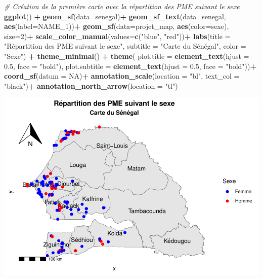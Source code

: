 \documentclass[
]{article}
\newenvironment{Shaded}{\begin{snugshade}}{\end{snugshade}}
\newcommand{\AttributeTok}[1]{\textcolor[rgb]{0.13,0.29,0.53}{#1}}
\newcommand{\CommentTok}[1]{\textcolor[rgb]{0.56,0.35,0.01}{\textit{#1}}}
\newcommand{\ConstantTok}[1]{\textcolor[rgb]{0.56,0.35,0.01}{#1}}
\newcommand{\DecValTok}[1]{\textcolor[rgb]{0.00,0.00,0.81}{#1}}
\newcommand{\FloatTok}[1]{\textcolor[rgb]{0.00,0.00,0.81}{#1}}
\newcommand{\FunctionTok}[1]{\textcolor[rgb]{0.13,0.29,0.53}{\textbf{#1}}}
\newcommand{\NormalTok}[1]{#1}
\newcommand{\SpecialCharTok}[1]{\textcolor[rgb]{0.81,0.36,0.00}{\textbf{#1}}}
\newcommand{\StringTok}[1]{\textcolor[rgb]{0.31,0.60,0.02}{#1}}
\begin{document}
\begin{Shaded}
\begin{Highlighting}[]
\CommentTok{\# Création de la première carte avec la répartition des PME suivant le sexe}
\FunctionTok{ggplot}\NormalTok{() }\SpecialCharTok{+}
  \FunctionTok{geom\_sf}\NormalTok{(}\AttributeTok{data=}\NormalTok{senegal)}\SpecialCharTok{+}
  \FunctionTok{geom\_sf\_text}\NormalTok{(}\AttributeTok{data=}\NormalTok{senegal, }\FunctionTok{aes}\NormalTok{(}\AttributeTok{label=}\NormalTok{NAME\_1))}\SpecialCharTok{+}
  \FunctionTok{geom\_sf}\NormalTok{(}\AttributeTok{data=}\NormalTok{projet\_map, }\FunctionTok{aes}\NormalTok{(}\AttributeTok{color=}\NormalTok{sexe), }\AttributeTok{size=}\DecValTok{2}\NormalTok{)}\SpecialCharTok{+}
  \FunctionTok{scale\_color\_manual}\NormalTok{(}\AttributeTok{values=}\FunctionTok{c}\NormalTok{(}\StringTok{"blue"}\NormalTok{, }\StringTok{"red"}\NormalTok{))}\SpecialCharTok{+}
  \FunctionTok{labs}\NormalTok{(}\AttributeTok{title =} \StringTok{"Répartition des PME suivant le sexe"}\NormalTok{,}
       \AttributeTok{subtitle =} \StringTok{"Carte du Sénégal"}\NormalTok{,}
       \AttributeTok{color =} \StringTok{"Sexe"}\NormalTok{) }\SpecialCharTok{+}
  \FunctionTok{theme\_minimal}\NormalTok{() }\SpecialCharTok{+}
  \FunctionTok{theme}\NormalTok{(}
    \AttributeTok{plot.title =} \FunctionTok{element\_text}\NormalTok{(}\AttributeTok{hjust =} \FloatTok{0.5}\NormalTok{, }\AttributeTok{face =} \StringTok{"bold"}\NormalTok{),}
    \AttributeTok{plot.subtitle =} \FunctionTok{element\_text}\NormalTok{(}\AttributeTok{hjust =} \FloatTok{0.5}\NormalTok{, }\AttributeTok{face =} \StringTok{"bold"}\NormalTok{))}\SpecialCharTok{+}
  \FunctionTok{coord\_sf}\NormalTok{(}\AttributeTok{datum =} \ConstantTok{NA}\NormalTok{)}\SpecialCharTok{+}
  \FunctionTok{annotation\_scale}\NormalTok{(}\AttributeTok{location =} \StringTok{"bl"}\NormalTok{, }\AttributeTok{text\_col =} \StringTok{"black"}\NormalTok{)}\SpecialCharTok{+}
  \FunctionTok{annotation\_north\_arrow}\NormalTok{(}\AttributeTok{location =} \StringTok{"tl"}\NormalTok{)}
\end{Highlighting}
\end{Shaded}

\includegraphics{RMarkdown_files/figure-latex/unnamed-chunk-18-1.pdf}
\end{document}
